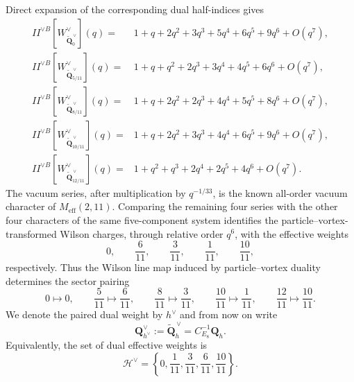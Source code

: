 \documentclass[11pt,a4paper]{article}
\numberwithin{equation}{section}
\begin{document}
Direct expansion of the corresponding dual half-indices gives
\begin{align}
I\!\!I^{\vee B}[W^\vee_{\widetilde{\boldsymbol Q}_{0}^{\,\vee}}](q)
={}&1+q+2q^2+3q^3+5q^4+6q^5+9q^6+O(q^7),\nonumber\\
I\!\!I^{\vee B}[W^\vee_{\widetilde{\boldsymbol Q}_{5/11}^{\,\vee}}](q)
={}&1+q+q^2+2q^3+3q^4+4q^5+6q^6+O(q^7),\nonumber\\
I\!\!I^{\vee B}[W^\vee_{\widetilde{\boldsymbol Q}_{8/11}^{\,\vee}}](q)
={}&1+q+2q^2+2q^3+4q^4+5q^5+8q^6+O(q^7),\nonumber\\
I\!\!I^{\vee B}[W^\vee_{\widetilde{\boldsymbol Q}_{10/11}^{\,\vee}}](q)
={}&1+q+2q^2+3q^3+4q^4+6q^5+9q^6+O(q^7),\nonumber\\
I\!\!I^{\vee B}[W^\vee_{\widetilde{\boldsymbol Q}_{12/11}^{\,\vee}}](q)
={}&1+q^2+q^3+2q^4+2q^5+4q^6+O(q^7).
  \label{eq:dual-Wilson-series}
\end{align}
The vacuum series, after multiplication by $q^{-1/33}$, is the known all-order vacuum character of $M_{\mathrm{eff}}(2,11)$.  Comparing the remaining four series with the other four characters of the same five-component system identifies the particle--vortex-transformed Wilson charges, through relative order $q^6$, with the effective weights
\begin{equation}
  0,\qquad \frac6{11},\qquad \frac3{11},\qquad \frac1{11},\qquad \frac{10}{11},
\end{equation}
respectively.  Thus the Wilson line map induced by particle--vortex duality determines the sector pairing
\begin{equation}
  0\mapsto0,
  \qquad
  \frac5{11}\mapsto\frac6{11},
  \qquad
  \frac8{11}\mapsto\frac3{11},
  \qquad
  \frac{10}{11}\mapsto\frac1{11},
  \qquad
  \frac{12}{11}\mapsto\frac{10}{11}.
  \label{eq:particle-vortex-sector-map}
\end{equation}
We denote the paired dual weight by $h^\vee$ and from now on write
\begin{equation}
  \boldsymbol Q_{h^\vee}^\vee
  :=\widetilde{\boldsymbol Q}_{h}^{\,\vee}
  =C_{E_8}^{-1}\boldsymbol Q_h.
  \label{eq:paired-dual-Wilson-charge}
\end{equation}
Equivalently, the set of dual effective weights is
\begin{equation}
  \mathcal H^\vee
  =\left\{0,\frac1{11},\frac3{11},\frac6{11},\frac{10}{11}\right\}.
  \label{eq:dual-five-weight-set}
\end{equation}
\end{document}
